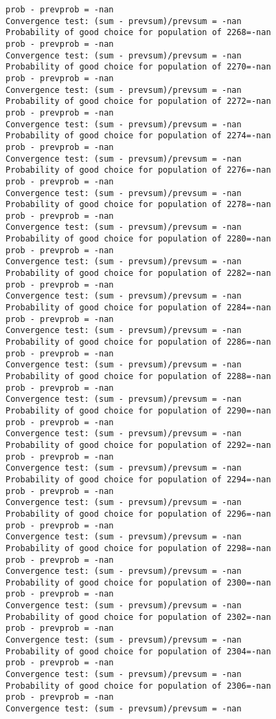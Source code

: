 \documentclass[11pt,onecolumn]{article}
\begin{document}
\begin{verbatim}
prob - prevprob = -nan
Convergence test: (sum - prevsum)/prevsum = -nan
Probability of good choice for population of 2268=-nan
prob - prevprob = -nan
Convergence test: (sum - prevsum)/prevsum = -nan
Probability of good choice for population of 2270=-nan
prob - prevprob = -nan
Convergence test: (sum - prevsum)/prevsum = -nan
Probability of good choice for population of 2272=-nan
prob - prevprob = -nan
Convergence test: (sum - prevsum)/prevsum = -nan
Probability of good choice for population of 2274=-nan
prob - prevprob = -nan
Convergence test: (sum - prevsum)/prevsum = -nan
Probability of good choice for population of 2276=-nan
prob - prevprob = -nan
Convergence test: (sum - prevsum)/prevsum = -nan
Probability of good choice for population of 2278=-nan
prob - prevprob = -nan
Convergence test: (sum - prevsum)/prevsum = -nan
Probability of good choice for population of 2280=-nan
prob - prevprob = -nan
Convergence test: (sum - prevsum)/prevsum = -nan
Probability of good choice for population of 2282=-nan
prob - prevprob = -nan
Convergence test: (sum - prevsum)/prevsum = -nan
Probability of good choice for population of 2284=-nan
prob - prevprob = -nan
Convergence test: (sum - prevsum)/prevsum = -nan
Probability of good choice for population of 2286=-nan
prob - prevprob = -nan
Convergence test: (sum - prevsum)/prevsum = -nan
Probability of good choice for population of 2288=-nan
prob - prevprob = -nan
Convergence test: (sum - prevsum)/prevsum = -nan
Probability of good choice for population of 2290=-nan
prob - prevprob = -nan
Convergence test: (sum - prevsum)/prevsum = -nan
Probability of good choice for population of 2292=-nan
prob - prevprob = -nan
Convergence test: (sum - prevsum)/prevsum = -nan
Probability of good choice for population of 2294=-nan
prob - prevprob = -nan
Convergence test: (sum - prevsum)/prevsum = -nan
Probability of good choice for population of 2296=-nan
prob - prevprob = -nan
Convergence test: (sum - prevsum)/prevsum = -nan
Probability of good choice for population of 2298=-nan
prob - prevprob = -nan
Convergence test: (sum - prevsum)/prevsum = -nan
Probability of good choice for population of 2300=-nan
prob - prevprob = -nan
Convergence test: (sum - prevsum)/prevsum = -nan
Probability of good choice for population of 2302=-nan
prob - prevprob = -nan
Convergence test: (sum - prevsum)/prevsum = -nan
Probability of good choice for population of 2304=-nan
prob - prevprob = -nan
Convergence test: (sum - prevsum)/prevsum = -nan
Probability of good choice for population of 2306=-nan
prob - prevprob = -nan
Convergence test: (sum - prevsum)/prevsum = -nan

\end{verbatim}
\end{document}

